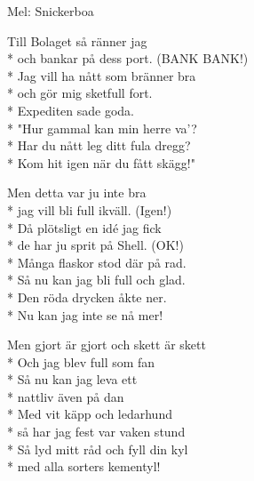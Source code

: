 \begin{SongText}[Bolaget]
    \begin{SongInfo}
        Mel: Snickerboa
    \end{SongInfo}
    \begin{SongVerse}
        Till Bolaget så ränner jag\\*%
        och bankar på dess port. (BANK BANK!)\\*%
        Jag vill ha nått som bränner bra\\*%
        och gör mig sketfull fort.\\*%
        Expediten sade goda.\\*%
        "Hur gammal kan min herre va'?\\*%
        Har du nått leg ditt fula dregg?\\*%
        Kom hit igen när du fått skägg!"
    \end{SongVerse}
    \begin{SongVerse}
        Men detta var ju inte bra\\*%
        jag vill bli full ikväll. (Igen!)\\*%
        Då plötsligt en idé jag fick\\*%
        de har ju sprit på Shell. (OK!)\\*%
        Många flaskor stod där på rad.\\*%
        Så nu kan jag bli full och glad.\\*%
        Den röda drycken åkte ner.\\*%
        Nu kan jag inte se nå mer!
    \end{SongVerse}
    \begin{SongVerse}
        Men gjort är gjort och skett är skett\\*%
        Och jag blev full som fan\\*%
        Så nu kan jag leva ett\\*%
        nattliv även på dan\\*%
        Med vit käpp och ledarhund\\*%
        så har jag fest var vaken stund\\*%
        Så lyd mitt råd och fyll din kyl\\*%
        med alla sorters kementyl!
    \end{SongVerse}
\end{SongText}

